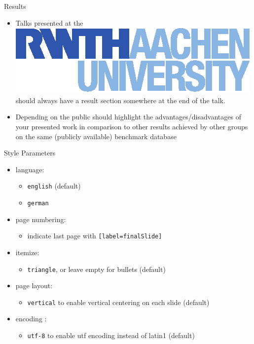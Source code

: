 \documentclass[xcolor=table,mathserif,9pt]{beamer}    %
\begin{document}
\begin{frame}{Results}
\begin{itemize}
\item Talks presented at the
  \href{http:://www-i6.rwth-aachen.de/}{\includegraphics[height=\baselineskip]{logos/logo_hltpr_rgb_RWTH.eps}}
  should always have a result section somewhere at the end of the talk.
\item Depending on the public should highlight the
  advantages/disadvantages of your presented work in comparison to
  other results achieved by other groups on the same (publicly
  available) benchmark database
\end{itemize}
\end{frame}

\begin{frame}{Style Parameters}
\begin{itemize}
\item language: 
  \begin{itemize}
  \item \texttt{english} (default)
  \item \texttt{german}
  \end{itemize}
\item page numbering:
\begin{itemize}
 \item indicate last page with \texttt{[label=finalSlide]}
\end{itemize}
\item itemize: 
  \begin{itemize}
  \item \texttt{triangle}, or leave empty for bullets (default)
  \end{itemize}
\item page layout: 
  \begin{itemize}
  \item \texttt{vertical} to enable vertical centering on each slide (default)
  \end{itemize}
\item encoding : 
  \begin{itemize}
  \item \texttt{utf-8} to enable utf encoding instead of latin1 (default)
  \end{itemize}
\end{itemize}
\end{frame}
\end{document}
